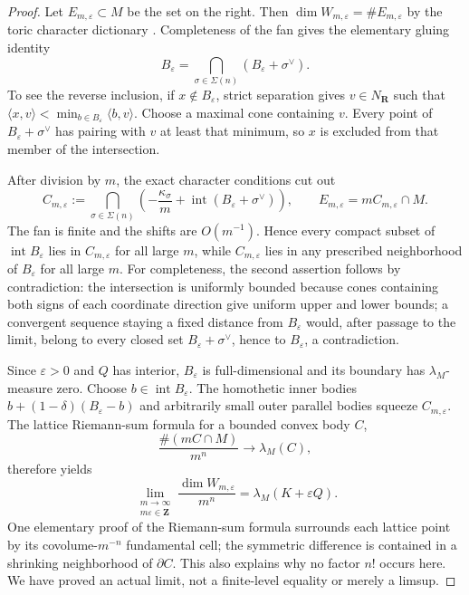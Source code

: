 \begin{proof}
Let $E_{m,\varepsilon}\subset M$ be the set on the right.  Then
$\dim W_{m,\varepsilon}=\#E_{m,\varepsilon}$ by the toric character
dictionary \cite[\S4.3]{CLS11}.  Completeness of the fan gives the elementary
gluing identity
\[
 B_\varepsilon
   =\bigcap_{\sigma\in\Sigma(n)}
        (B_\varepsilon+\sigma^\vee).
\]
To see the reverse inclusion, if $x\notin B_\varepsilon$, strict separation
gives $v\in N_{\mathbf R}$ such that
$\langle x,v\rangle<\min_{b\in B_\varepsilon}\langle b,v\rangle$.
Choose a maximal cone containing $v$.  Every point of
$B_\varepsilon+\sigma^\vee$ has pairing with $v$ at least that minimum,
so $x$ is excluded from that member of the intersection.

After division by $m$, the exact character conditions cut out
\[
 C_{m,\varepsilon}:=
 \bigcap_{\sigma\in\Sigma(n)}
 \left(-\frac{\kappa_\sigma}{m}
       +\operatorname{int}(B_\varepsilon+\sigma^\vee)\right),
 \qquad
 E_{m,\varepsilon}=mC_{m,\varepsilon}\cap M.
\]
The fan is finite and the shifts are $O(m^{-1})$.  Hence every compact
subset of $\operatorname{int}B_\varepsilon$ lies in
$C_{m,\varepsilon}$ for all large $m$, while
$C_{m,\varepsilon}$ lies in any prescribed neighborhood of
$B_\varepsilon$ for all large $m$.  For completeness, the second
assertion follows by contradiction: the intersection is uniformly bounded
because cones containing both signs of each coordinate direction give
uniform upper and lower bounds; a convergent sequence staying a fixed
distance from $B_\varepsilon$ would, after passage to the limit, belong to
every closed set $B_\varepsilon+\sigma^\vee$, hence to
$B_\varepsilon$, a contradiction.

Since $\varepsilon>0$ and $Q$ has interior, $B_\varepsilon$ is
full-dimensional and its boundary has $\lambda_M$-measure zero.  Choose
$b\in\operatorname{int}B_\varepsilon$.  The homothetic inner bodies
$b+(1-\delta)(B_\varepsilon-b)$ and arbitrarily small outer parallel
bodies squeeze $C_{m,\varepsilon}$.  The lattice Riemann-sum formula for a
bounded convex body $C$,
\[
             \frac{\#(mC\cap M)}{m^n}\longrightarrow\lambda_M(C),
\]
therefore yields
\[
 \lim_{\substack{m\to\infty\\m\varepsilon\in\mathbf Z}}
 \frac{\dim W_{m,\varepsilon}}{m^n}
       =\lambda_M(K+\varepsilon Q).
\]
One elementary proof of the Riemann-sum formula surrounds each lattice point
by its covolume-$m^{-n}$ fundamental cell; the symmetric difference is
contained in a shrinking neighborhood of $\partial C$.  This also explains
why no factor $n!$ occurs here.  We have proved an actual limit, not a
finite-level equality or merely a limsup.


\end{proof}
